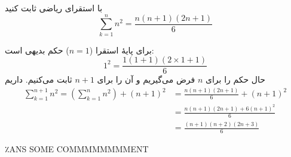 با استقرای ریاضی ثابت کنید
$$
\sum_{k=1}^{n}n^2=\frac{n(n+1)(2n+1)}{6}
$$
\begin{ans}
  برای پایهٔ استقرا ($n=1$) حکم بدیهی است:
  $$
  1^2 = \frac{1(1+1)(2\times 1+1)}{6}
  $$
  حال حکم را برای $n$ فرض می‌گیریم و آن را برای $n+1$ ثابت می‌کنیم. داریم
  \begin{align*}
  \sum_{k=1}^{n+1}n^2=(\sum_{k=1}^{n}n^2)+(n+1)^2&=\frac{n(n+1)(2n+1)}{6}+(n+1)^2\\
  &=\frac{n(n+1)(2n+1)+6(n+1)^2}{6}\\
  &=\frac{(n+1)(n+2)(2n+3)}{6}
  \end{align*}
\end{ans}
٪ANS SOME COMMMMMMMMENT
